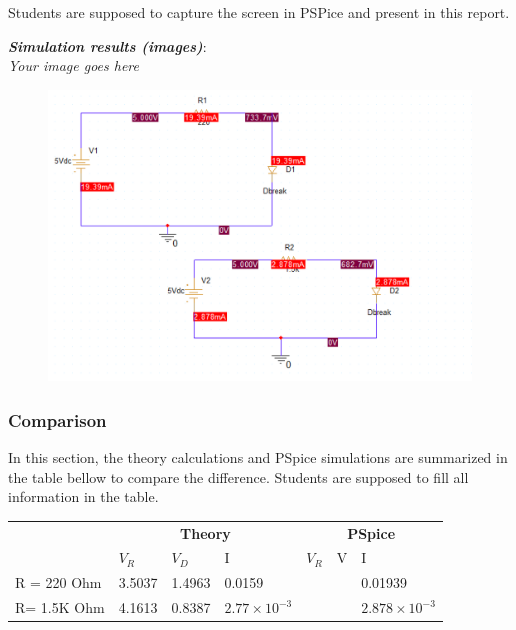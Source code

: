 Students are supposed to capture the screen in PSPice and present in this report.

\textit{\textbf{Simulation results (images)}}:\\ \textit{Your image goes here}
\begin{figure}[!htp]
    \centering
    \includegraphics[width = 500px]{source/picture/bai_2/sim_ex1.png}
\end{figure}
\newpage

\subsubsection{Comparison}
In this section, the theory calculations and PSpice simulations are summarized in the table bellow to compare the difference. Students are supposed to fill all information in the table.
\begin{center}
    \begin{tabular}{l|l|l|l|l|l|l|}
        \cline{2-7}
                                          & \multicolumn{3}{c|}{\textbf{Theory}} & \multicolumn{3}{c|}{\textbf{PSpice}}                                                              \\ \cline{2-7}
                                          & $V_R$                                & $V_D$                                & I                     & $V_R$ & V & I                      \\ \hline
        \multicolumn{1}{|l|}{R = 220 Ohm} & 3.5037                               & 1.4963                               & 0.0159                &       &   & 0.01939                \\ \hline
        \multicolumn{1}{|l|}{R= 1.5K Ohm} & 4.1613                               & 0.8387                               & $2.77 \times 10^{-3}$ &       &   & $2.878 \times 10^{-3}$ \\ \hline
    \end{tabular}
\end{center}


